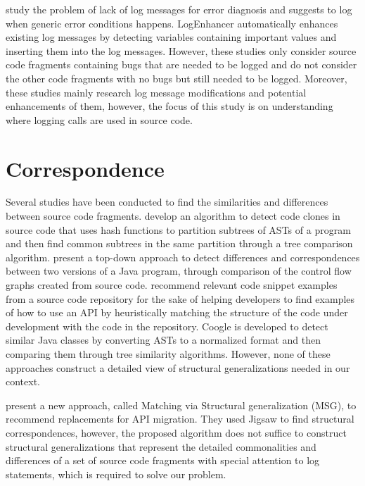 \citet{yuan2012conservative} study the problem of lack of log messages for error diagnosis and suggests to log when generic error conditions happens. LogEnhancer \cite{yuan2012improving} automatically enhances existing log messages by detecting variables containing important values and inserting them into the log messages. However, these studies only consider source code fragments containing bugs that are needed to be logged and do not consider the other code fragments with no bugs but still needed to be logged. Moreover, these studies mainly research log message modifications and potential enhancements of them, however, the focus of this study is on understanding where logging calls are used in source code.

\section{Correspondence}  \label{ch7-corr}
Several studies have been conducted to find the similarities and differences between source code fragments. \citet{baxter1998clone} develop an algorithm to detect code clones in source code that uses hash functions to partition subtrees of ASTs of a program and then find common subtrees in the same partition through a tree comparison algorithm. \citet{apiwattanapong2004differencing} present a top-down approach to detect differences and correspondences between two versions of a Java program, through comparison of the control flow graphs created from source code. \citet{holmes2005strathcona} recommend relevant code snippet examples from a source code repository for the sake of helping developers to find examples of how to use an API by heuristically matching the structure of the code under development with the code in the repository. Coogle \cite{sager2006detecting} is developed to detect similar Java classes by converting ASTs to a normalized format and then comparing them through tree similarity algorithms. However, none of these approaches construct a detailed view of structural generalizations needed in our context.
 
\citet{2014:uofc:cossette} present a new approach, called Matching via Structural generalization (MSG), to recommend replacements for API migration. They used Jigsaw to find structural correspondences, however, the proposed algorithm does not suffice to construct structural generalizations that represent the detailed commonalities and differences of a set of source code fragments with special attention to log statements, which is required to solve our problem.

